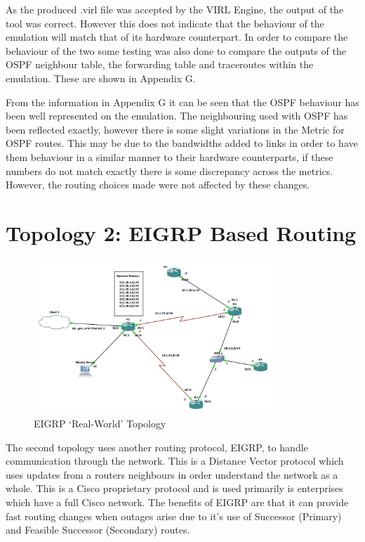 \documentclass[11pt]{report}
\begin{document}
As the produced .virl file was accepted by the VIRL Engine, the output of the tool was correct. However this does not indicate that the behaviour of the emulation will match that of its hardware counterpart. In order to compare the behaviour of the two some testing was also done to compare the outputs of the OSPF neighbour table, the forwarding table and traceroutes within the emulation. These are shown in Appendix G.

From the information in Appendix G it can be seen that the OSPF behaviour has been well represented on the emulation. The neighbouring used with OSPF has been reflected exactly, however there is some slight variations in the Metric for OSPF routes. This may be due to the bandwidths added to links in order to have them behaviour in a similar manner to their hardware counterparts, if these numbers do not match exactly there is some discrepancy across the metrics. However, the routing choices made were not affected by these changes.

\section{Topology 2: EIGRP Based Routing}

\begin{figure}[h!]
	\caption{EIGRP `Real-World' Topology}
	\centering
	\begin{center}
		\includegraphics[width=0.8\textwidth]{EIGRP-Topology.png}
	\end{center}
\end{figure}

The second topology uses another routing protocol, EIGRP, to handle communication through the network. This is a Distance Vector protocol which uses updates from a routers neighbours in order understand the network as a whole. This is a Cisco proprietary protocol and is used primarily is enterprises which have a full Cisco network. The benefits of EIGRP are that it can provide fast routing changes when outages arise due to it's use of Successor (Primary) and Feasible Successor (Secondary) routes.
\end{document}

